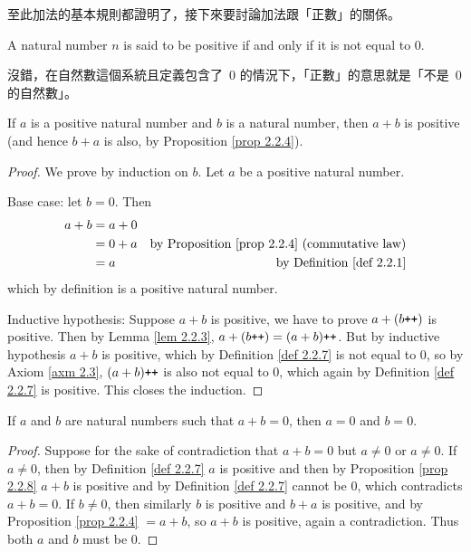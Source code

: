 \begin{note}
至此加法的基本規則都證明了，接下來要討論加法跟「正數」的關係。
\end{note}

\begin{definition} \label{def 2.2.7} A natural number \(n\) is said to be positive if and only if it is not equal to \(0\).
\end{definition}
\begin{note}
沒錯，在自然數這個系統且定義包含了\ \(0\) 的情況下，「正數」的意思就是「不是\ \(0\) 的自然數」。
\end{note}

\begin{proposition}\label{prop 2.2.8} If \(a\) is a positive natural number and \(b\) is a natural number, then \(a + b\) is positive (and hence \(b + a\) is also, by Proposition \ref{prop 2.2.4}).
\end{proposition}

\begin{proof}
We prove by induction on \(b\). Let \(a\) be a positive natural number.

Base case: let \(b = 0\). Then
\begin{align*}
a + b & = a + 0 & \\
      & = 0 + a & \text{by Proposition \ref{prop 2.2.4} (commutative law)} \\
      & = a     & \text{by Definition \ref{def 2.2.1}}
\end{align*}
which by definition is a positive natural number.

Inductive hypothesis: Suppose \(a + b\) is positive, we have to prove \(a + (b\texttt{++})\) is positive. Then by Lemma \ref{lem 2.2.3}, \(a + (b\texttt{++}) = (a + b)\texttt{++}\). But by inductive hypothesis \(a + b\) is positive, which by Definition \ref{def 2.2.7} is not equal to \(0\), so by Axiom \ref{axm 2.3}, \((a + b)\texttt{++}\) is also not equal to \(0\), which again by Definition \ref{def 2.2.7} is positive. This closes the induction.
\end{proof}

\begin{corollary} \label{corollary 2.2.9}
If \(a\) and \(b\) are natural numbers such that \(a + b = 0\), then \(a = 0\) and \(b = 0\).
\end{corollary}

\begin{proof}
Suppose for the sake of contradiction that \(a + b = 0\) but \(a \neq 0\) or \(a \neq 0\). If \(a \neq 0\), then by Definition \ref{def 2.2.7} \(a\) is positive and then by Proposition \ref{prop 2.2.8} \(a + b\) is positive and by Definition \ref{def 2.2.7} cannot be \(0\), which contradicts \(a + b = 0\). If \(b \neq 0\), then similarly \(b\) is positive and \(b + a\) is positive, and by Proposition \ref{prop 2.2.4} \(= a + b\), so \(a + b\) is positive, again a contradiction. Thus both \(a\) and \(b\) must be \(0\).
\end{proof}

